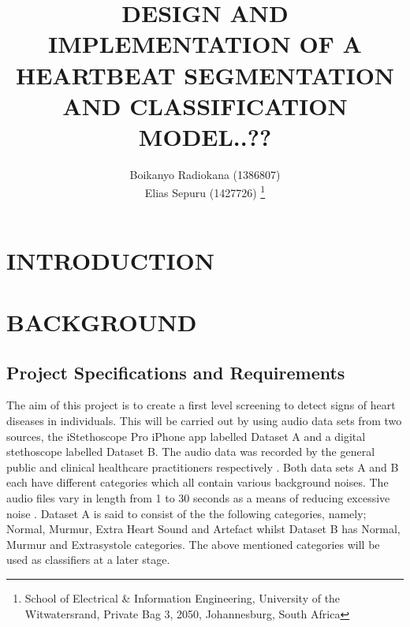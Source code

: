 \documentclass[10pt,twocolumn]{witseiepaper}
\begin{document}
\title{DESIGN AND IMPLEMENTATION OF A HEARTBEAT SEGMENTATION AND CLASSIFICATION MODEL..??}

\author{Boikanyo Radiokana (1386807) \\ Elias Sepuru (1427726)
\thanks{School of Electrical \& Information Engineering, University of the
Witwatersrand, Private Bag 3, 2050, Johannesburg, South Africa}
}


%



\maketitle
\thispagestyle{empty}\pagestyle{empty}


%
\section{INTRODUCTION}

\section{BACKGROUND}

%
\subsection{Project Specifications and Requirements}
\label{PSR}
The aim of this project is to create a first level screening to detect signs of heart diseases in individuals. This will be carried out by using audio data sets from two sources, the iStethoscope Pro iPhone app labelled Dataset A and a digital stethoscope labelled Dataset B. The audio data was recorded by the general public and clinical healthcare practitioners respectively \cite{pascal}. Both data sets A and B each have different categories which all contain various background noises. The audio files vary in length from 1 to 30 seconds as a means of reducing excessive noise \cite{pascal}. Dataset A is said to consist of the the following categories, namely; Normal, Murmur, Extra Heart Sound and Artefact whilst Dataset B has Normal, Murmur and Extrasystole categories. The above mentioned categories will be used as classifiers at a later stage.
\end{document}
